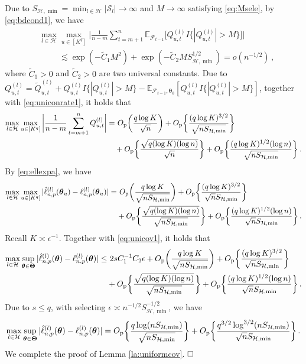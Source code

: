 \documentclass[12pt]{article}
\newcommand{\bTheta}{\boldsymbol \Theta}
\newcommand{\btheta}{\boldsymbol \theta}
\newcommand{\0}{{\bf 0}}
\begin{document}
Due to $S_{\mathcal{H},\min}=\min_{l\in\mathcal{H}}|\mathcal{S}_l|\rightarrow\infty$ and $M\rightarrow\infty$ satisfying \eqref{eq:Msele}, by \eqref{eq:bdcond1}, we have
\begin{align*}
&\max_{l\in\mathcal{H}}\max_{u\in[K^q]}\bigg|\frac{1}{n-m}\sum_{t=m+1}^n\mathbb{E}_{\mathcal{F}_{t-1}}\big[Q_{u,t}^{(l)}I\big\{|Q_{u,t}^{(l)}|>M\big\}\big]\bigg|\\
&~~~~~~~~~~~\lesssim \exp(-\tilde{C}_1M^2)+\exp(-\tilde{C}_2MS_{\mathcal{H},\min}^{1/2})=o(n^{-1/2})\,,
\end{align*}
where $\tilde{C}_1>0$ and $\tilde{C}_2>0$ are two universal constants. Due to $Q_{u,t}^{(l)}=\tilde{Q}_{u,t}^{(l)}+Q_{u,t}^{(l)}I\{|Q_{u,t}^{(l)}|>M\}-\mathbb{E}_{\mathcal{F}_{t-1},\btheta_0}[Q_{u,t}^{(l)}I\{|Q_{u,t}^{(l)}|>M\}]$, together with \eqref{eq:uniconrate1}, it holds that 
\begin{align}
\max_{l\in\mathcal{H}}\max_{u\in[K^q]}\bigg|\frac{1}{n-m}\sum_{t=m+1}^nQ_{u,t}^{(l)}\bigg|=&~O_{\rm p}\bigg(\frac{q\log K}{\sqrt{n}}\bigg)+O_{\rm p}\bigg\{\frac{(q\log K)^{3/2}}{\sqrt{nS_{\mathcal{H},\min}}}\bigg\}\label{eq:toprovebd1}\\
&+O_{\rm p}\bigg\{\frac{\sqrt{q(\log K)(\log n)}}{\sqrt{n}}\bigg\}+O_{\rm p}\bigg\{\frac{(q\log K)^{1/2}(\log n)}{\sqrt{nS_{\mathcal{H},\min}}}\bigg\}\,.\notag
\end{align}
By \eqref{eq:ellexpa}, we have 
\begin{align*}
\max_{l\in\mathcal{H}}\max_{u\in[K^q]}|\hat{\ell}_{n,p}^{(l)}(\btheta_u) - \ell_{n,p}^{(l)}(\btheta_u)|=&~O_{\rm p}\bigg(\frac{q\log K}{\sqrt{nS_{\mathcal{H},\min}}}\bigg)+O_{\rm p}\bigg\{\frac{(q\log K)^{3/2}}{\sqrt{n}S_{\mathcal{H},\min}}\bigg\}\\
&+O_{\rm p}\bigg\{\frac{\sqrt{q(\log K)(\log n)}}{\sqrt{nS_{\mathcal{H},\min}}}\bigg\}+O_{\rm p}\bigg\{\frac{(q\log K)^{1/2}(\log n)}{\sqrt{n}S_{\mathcal{H},\min}}\bigg\}\,.
\end{align*}
Recall $K\asymp \epsilon^{-1}$. Together with \eqref{eq:unicov1}, it holds that 
\begin{align*}
\max_{l\in\mathcal{H}}\sup_{\btheta \in \bTheta}|\hat{\ell}_{n,p}^{(l)}(\btheta) - \ell_{n,p}^{(l)}(\btheta)|\leq&~2sC_1^{-1}C_2\epsilon+O_{\rm p}\bigg(\frac{q\log K}{\sqrt{nS_{\mathcal{H},\min}}}\bigg)+O_{\rm p}\bigg\{\frac{(q\log K)^{3/2}}{\sqrt{n}S_{\mathcal{H},\min}}\bigg\}\\
&+O_{\rm p}\bigg\{\frac{\sqrt{q(\log K)(\log n)}}{\sqrt{nS_{\mathcal{H},\min}}}\bigg\}+O_{\rm p}\bigg\{\frac{(q\log K)^{1/2}(\log n)}{\sqrt{n}S_{\mathcal{H},\min}}\bigg\}\,.
\end{align*}
Due to $s\leq q$, with selecting $\epsilon\asymp n^{-1/2}S_{\mathcal{H},\min}^{-1/2}$, we have
\begin{align*}
\max_{l\in\mathcal{H}}\sup_{\btheta \in \bTheta}|\hat{\ell}_{n,p}^{(l)}(\btheta) - \ell_{n,p}^{(l)}(\btheta)|=O_{\rm p}\bigg\{\frac{q\log(nS_{\mathcal{H},\min})}{\sqrt{nS_{\mathcal{H},\min}}}\bigg\}+O_{\rm p}\bigg\{\frac{q^{3/2}\log^{3/2}(nS_{\mathcal{H},\min})}{\sqrt{n}S_{\mathcal{H},\min}}\bigg\}\,.
\end{align*}
We complete the proof of Lemma \ref{la:uniformcov}. $\hfill\Box$
\end{document}
